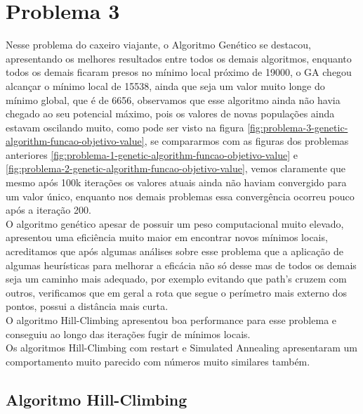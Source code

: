 \section[Problema 3]{Problema 3}

Nesse problema do caxeiro viajante, o Algoritmo Genético se destacou, apresentando os melhores resultados entre todos os demais algoritmos, enquanto todos os demais ficaram presos no mínimo local próximo de 19000, o GA chegou alcançar o mínimo local de 15538, ainda que seja um valor muito longe do mínimo global, que é de 6656, observamos que esse algoritmo ainda não havia chegado ao seu potencial máximo, pois os valores de novas populações ainda estavam oscilando muito, como pode ser visto na figura \ref{fig:problema-3-genetic-algorithm-funcao-objetivo-value}, se compararmos com as figuras dos problemas anteriores \ref{fig:problema-1-genetic-algorithm-funcao-objetivo-value} e \ref{fig:problema-2-genetic-algorithm-funcao-objetivo-value}, vemos claramente que mesmo após 100k iterações os valores atuais ainda não haviam convergido para um valor único, enquanto nos demais problemas essa convergência ocorreu pouco após a iteração 200. \\

O algoritmo genético apesar de possuir um peso computacional muito elevado, apresentou uma eficiência muito maior em encontrar novos mínimos locais, acreditamos que após algumas análises sobre esse problema que a aplicação de algumas heurísticas para melhorar a eficácia não só desse mas de todos os demais seja um caminho mais adequado, por exemplo evitando que path's cruzem com outros, verificamos que em geral a rota que segue o perímetro mais externo dos pontos, possui a distância mais curta. \\

O algoritmo Hill-Climbing apresentou boa performance para esse problema e conseguiu ao longo das iterações fugir de mínimos locais. \\

Os algoritmos Hill-Climbing com restart e Simulated Annealing apresentaram um comportamento muito parecido com números muito similares também.

\subsection{Algoritmo Hill-Climbing}

